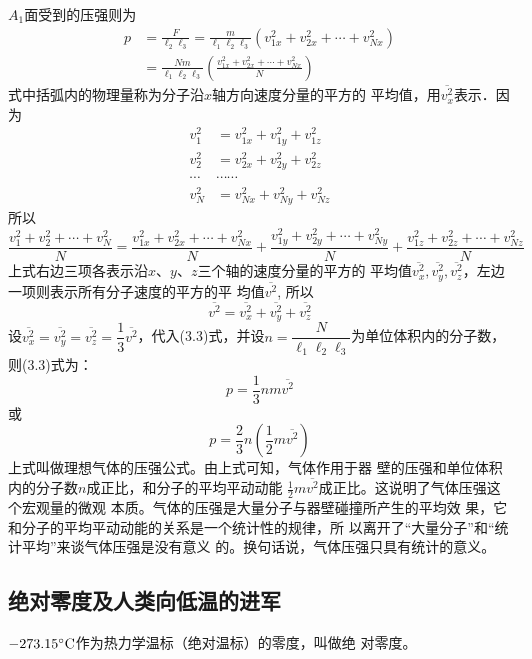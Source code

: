 $A_1$面受到的压强则为
\begin{equation}
    \begin{split}
 p&=\frac{F}{\ell_2\ell_3}=\frac{m}{\ell_1\ell_2\ell_3}\left(v^2_{1x}+v^2_{2x}+\cdots+v^2_{Nx}\right)\\
 &=\frac{Nm}{\ell_1\ell_2\ell_3} \left(\frac{v^2_{1x}+v^2_{2x}+\cdots+v^2_{Nx}}{N}\right)      
    \end{split}
\end{equation}
式中括弧内的物理量称为分子沿$x$轴方向速度分量的平方的
平均值，用$\overline{v^2_x}$表示．因为
\[\begin{split}
{v}_{1}^{2}&=v_{1 x}^{2}+v_{1 y}^{2}+v_{1 z}^{2} \\
{v}_{2}^{2}&=v_{2 x}^{2}+v_{2 y}^{2}+v_{2 z}^{2} \\
\cdots& \cdots \cdots \\
{v}_{N}^{2}&=v_{N x}^{2}+v_{N y}^{2}+v_{N z}^{2}  
\end{split}\]
所以
\[\frac{v_{1}^{2}+v_{2}^{2}+\cdots+v_{N}^{2}}{N}= \frac{v_{1 x}^{2}+v_{2 x}^{2}+\cdots+v_{N x}^{2}}{N}+\frac{v_{1 y}^{2}+v_{2 y}^{2}+\cdots+v_{N y}^{2}}{N} +\frac{v_{1 z}^{2}+v_{2 z}^{2}+\cdots+v_{N z}^{2}}{N}\]
上式右边三项各表示沿$x$、$y$、$z$三个轴的速度分量的平方的
平均值$\overline{v^2_x},\overline{v^2_y},\overline{v^2_z}$，左边一项则表示所有分子速度的平方的平
均值$\overline{v^2}$, 所以
\[\overline{v^2}=\overline{v^2_x}+\overline{v^2_y}+\overline{v^2_z}\]
设$\overline{v^2_x}=\overline{v^2_y}=\overline{v^2_z}=\dfrac{1}{3}\overline{v^2}$，代入(3.3)式，并设$n=\dfrac{N}{\ell_1\ell_2\ell_3}$为单位体积内的分子数，则(3.3)式为：
\[p=\frac{1}{3}nm\overline{v^2}\]
或
\begin{equation}
    p=\frac{2}{3}n\left(\frac{1}{2}m\overline{v^2}\right)
\end{equation}
上式叫做理想气体的压强公式。由上式可知，气体作用于器
壁的压强和单位体积内的分子数$n$成正比，和分子的平均平动动能
$\frac{1}{2}m\overline{v^2}$成正比。这说明了气体压强这个宏观量的微观
本质。气体的压强是大量分子与器壁碰撞所产生的平均效
果，它和分子的平均平动动能的关系是一个统计性的规律，所
以离开了“大量分子”和“统计平均”来谈气体压强是没有意义
的。换句话说，气体压强只具有统计的意义。



\subsection{绝对零度及人类向低温的进军}
$-273.15^{\circ}{\rm C}$作为热力学温标（绝对温标）的零度，叫做绝
对零度。


